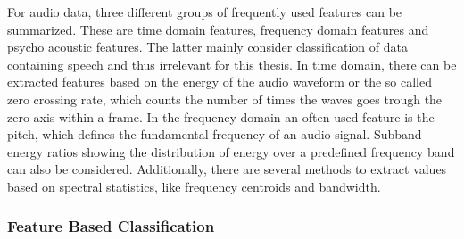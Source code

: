 

For audio data, three different groups of frequently used features can be summarized. These are time domain features, frequency domain features and psycho acoustic features. The latter mainly consider classification of data containing speech and thus irrelevant for this thesis. In time domain, there can be extracted features based on the energy of the audio waveform or the so called zero crossing rate, which counts the number of times the waves goes trough the zero axis within a frame. In the frequency domain an often used feature is the pitch, which defines the fundamental frequency of an audio signal. Subband energy ratios showing the distribution of energy over a predefined frequency band can also be considered. Additionally, there are several methods to extract values based on spectral statistics, like frequency centroids and bandwidth. 

\subsubsection{Feature Based Classification}

